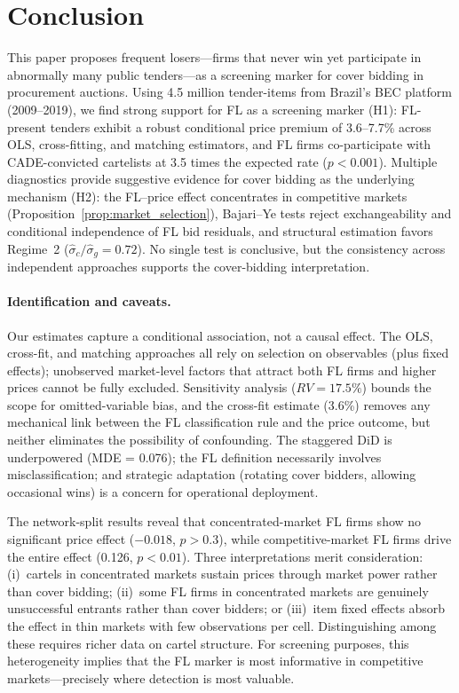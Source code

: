 \section{Conclusion}
\label{sec:conclusion}

This paper proposes frequent losers---firms that never win yet
participate in abnormally many public tenders---as a screening marker
for cover bidding in procurement auctions. Using 4.5 million
tender-items from Brazil's BEC platform (2009--2019), we find strong
support for FL as a screening marker (H1): FL-present tenders exhibit
a robust conditional price premium of 3.6--7.7\% across OLS,
cross-fitting, and matching estimators, and FL firms co-participate
with CADE-convicted cartelists at 3.5 times the expected rate
($p < 0.001$). Multiple diagnostics provide suggestive evidence for
cover bidding as the underlying mechanism (H2): the FL--price
effect concentrates in competitive markets
(Proposition~\ref{prop:market_selection}), Bajari--Ye tests reject
exchangeability and conditional independence of FL bid residuals, and
structural estimation favors Regime~2
($\hat{\sigma}_c / \hat{\sigma}_g = 0.72$). No single test is
conclusive, but the consistency across independent approaches
supports the cover-bidding interpretation.

\paragraph{Identification and caveats.}
Our estimates capture a conditional association, not a causal effect.
The OLS, cross-fit, and matching approaches all rely on selection on
observables (plus fixed effects); unobserved market-level factors
that attract both FL firms and higher prices cannot be fully excluded.
Sensitivity analysis ($RV = 17.5\%$) bounds the scope for
omitted-variable bias, and the cross-fit estimate (3.6\%) removes any
mechanical link between the FL classification rule and the price
outcome, but neither eliminates the possibility of confounding.
The staggered DiD is underpowered (MDE = 0.076); the FL definition
necessarily involves misclassification; and strategic adaptation
(rotating cover bidders, allowing occasional wins) is a concern for
operational deployment.

The network-split results reveal that concentrated-market FL firms
show no significant price effect ($-0.018$, $p > 0.3$), while
competitive-market FL firms drive the entire effect (0.126,
$p < 0.01$). Three interpretations merit consideration: (i)~cartels
in concentrated markets sustain prices through market power rather
than cover bidding; (ii)~some FL firms in concentrated markets are
genuinely unsuccessful entrants rather than cover bidders; or
(iii)~item fixed effects absorb the effect in thin markets with few
observations per cell. Distinguishing among these requires richer
data on cartel structure. For screening purposes, this heterogeneity
implies that the FL marker is most informative in competitive
markets---precisely where detection is most valuable.

